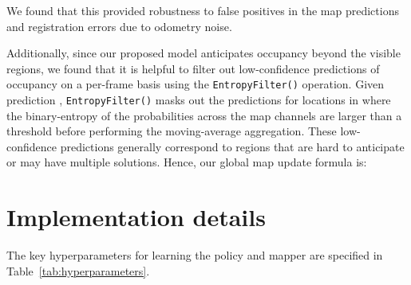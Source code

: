 \documentclass[runningheads]{llncs}
\newcommand{\code}[1]{\texttt{\small #1}}
\begin{document}
We found that this provided robustness to false positives in the map predictions and registration errors due to odometry noise.

Additionally, since our proposed model anticipates occupancy beyond the visible regions, we found that it is helpful to filter out low-confidence predictions of occupancy on a per-frame basis using the \code{EntropyFilter()} operation.
Given prediction , \code{EntropyFilter()} masks out the predictions for locations  in  where the binary-entropy of the probabilities across the map channels are larger than a threshold  before performing the moving-average aggregation.
These low-confidence predictions generally correspond to regions that are hard to anticipate or may have multiple solutions.
Hence, our global map update formula is:


\vfill
\pagebreak

\section{Implementation details}
\label{sec:implementation_details}
The key hyperparameters for learning the policy and mapper are specified in Table~\ref{tab:hyperparameters}.
\end{document}
